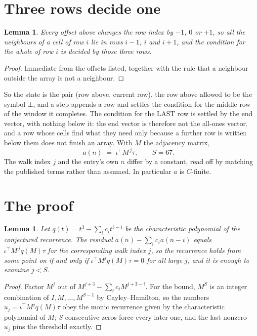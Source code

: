 \documentclass[11pt,a4paper]{article}
\theoremstyle{plain}
\newtheorem{lemma}[theorem]{Lemma}
\theoremstyle{definition}
\begin{document}
\section{Three rows decide one}

\begin{lemma}\label{lem:win}
Every offset above changes the row index by $-1$, $0$ or $+1$, so all the neighbours of a cell
of row $i$ lie in rows $i-1$, $i$ and $i+1$, and the condition for the whole of row $i$ is
decided by those three rows.
\end{lemma}

\begin{proof}
Immediate from the offsets listed, together with the rule that a neighbour outside the array is
not a neighbour.
\end{proof}

So the state is the pair (row above, current row), the row above allowed to be the symbol
$\bot$, and a step appends a row and settles the condition for the middle row of the window it
completes. The condition for the LAST row is settled by the end vector, with nothing below it:
the end vector is therefore not the all-ones vector, and a row whose cells find what they need
only because a further row is written below them does not finish an array. With $M$ the
adjacency matrix,
\[
a(n)\;=\;\iota^{\!\top}M^{\,j}\tau ,\qquad S=67.
\]
The walk index $j$ and the entry's own $n$ differ by a constant, read off by matching the
published terms rather than assumed. In particular $a$ is $C$-finite.

\section{The proof}

\begin{lemma}\label{lem:crit}
Let $q(t)=t^{3}-\sum_i c_it^{3-i}$ be the characteristic polynomial of the
conjectured recurrence. The residual $a(n)-\sum_ic_ia(n-i)$ equals
$\iota^{\!\top}M^{\,j}q(M)\tau$ for the corresponding walk index $j$, so the recurrence
holds from some point on if and only if $\iota^{\!\top}M^{j}q(M)\tau=0$ for all large $j$,
and it is enough to examine $j<S$.
\end{lemma}

\begin{proof}
Factor $M^{j}$ out of $M^{j+3}-\sum_ic_iM^{j+3-i}$. For the bound, $M^{S}$
is an integer combination of $I,M,\dots,M^{S-1}$ by Cayley--Hamilton, so the numbers
$u_j=\iota^{\!\top}M^{j}q(M)\tau$ obey the monic recurrence given by the characteristic
polynomial of $M$; $S$ consecutive zeros force every later one, and the last nonzero $u_j$
pins the threshold exactly.
\end{proof}
\end{document}
